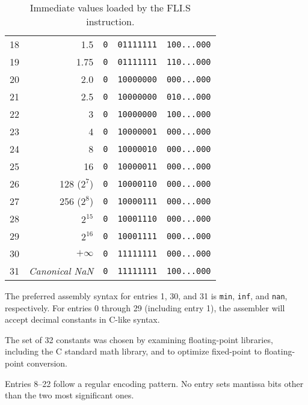 \begin{table}[h!]
\begin{tabular}{|r|r|c|c|c|}
18          & 1.5                              & {\tt 0} & {\tt 01111111} & {\tt 100...000} \\
19          & 1.75                             & {\tt 0} & {\tt 01111111} & {\tt 110...000} \\
20          & 2.0                              & {\tt 0} & {\tt 10000000} & {\tt 000...000} \\
21          & 2.5                              & {\tt 0} & {\tt 10000000} & {\tt 010...000} \\
22          & 3                                & {\tt 0} & {\tt 10000000} & {\tt 100...000} \\
23          & 4                                & {\tt 0} & {\tt 10000001} & {\tt 000...000} \\
24          & 8                                & {\tt 0} & {\tt 10000010} & {\tt 000...000} \\
25          & 16                               & {\tt 0} & {\tt 10000011} & {\tt 000...000} \\
26          & 128 ($2^7$)                      & {\tt 0} & {\tt 10000110} & {\tt 000...000} \\
27          & 256 ($2^8$)                      & {\tt 0} & {\tt 10000111} & {\tt 000...000} \\
28          & $2^{15}$                         & {\tt 0} & {\tt 10001110} & {\tt 000...000} \\
29          & $2^{16}$                         & {\tt 0} & {\tt 10001111} & {\tt 000...000} \\
30          & $+\infty$                        & {\tt 0} & {\tt 11111111} & {\tt 000...000} \\
31          & {\em Canonical NaN}              & {\tt 0} & {\tt 11111111} & {\tt 100...000} \\
\hline
\end{tabular}
\caption{Immediate values loaded by the FLI.S instruction.}
\label{tab:flis}
\end{table}

\begin{commentary}
The preferred assembly syntax for entries 1, 30, and 31 is {\tt min},
{\tt inf}, and {\tt nan}, respectively.
For entries 0 through 29 (including entry 1), the assembler will accept
decimal constants in C-like syntax.
\end{commentary}

\begin{commentary}
The set of 32 constants was chosen by examining floating-point libraries,
including the C standard math library, and to optimize fixed-point to
floating-point conversion.

Entries 8--22 follow a regular encoding pattern.
No entry sets mantissa bits other than the two most significant ones.
\end{commentary}

